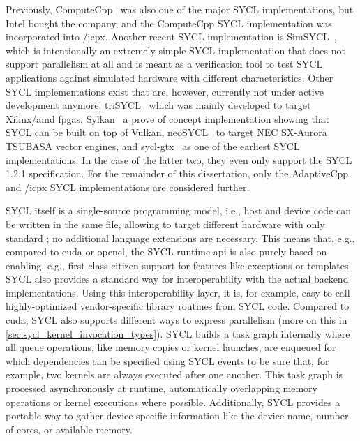 Previously, ComputeCpp~\cite{misra_development_2019} was also one of the major SYCL implementations, but Intel bought the company, and the ComputeCpp SYCL implementation was incorporated into \dpcpp/icpx. 
Another recent SYCL implementation is SimSYCL~\cite{thoman_simsycl_2024}, which is intentionally an extremely simple SYCL implementation that does not support parallelism at all and is meant as a verification tool to test SYCL applications against simulated hardware with different characteristics.  
Other SYCL implementations exist that are, however, currently not under active development anymore: triSYCL~\cite{gozillon_trisycl_2020, doumoulakis_sycl_2017} which was mainly developed to target Xilinx/\gls{amd} \glspl{fpga}, Sylkan~\cite{thoman_sylkan_2021} a prove of concept implementation showing that SYCL can be built on top of Vulkan, neoSYCL~\cite{ke_neosycl_2021} to target NEC SX-Aurora TSUBASA vector engines, and sycl-gtx~\cite{zuzek_implementation_2016} as one of the earliest SYCL implementations. 
In the case of the latter two, they even only support the SYCL 1.2.1 specification. 
For the remainder of this dissertation, only the AdaptiveCpp and \dpcpp/icpx SYCL implementations are considered further. 

SYCL itself is a single-source programming model, i.e., host and device code can be written in the same file, allowing to target different hardware with only standard \cpp; no additional language extensions are necessary. 
This means that, e.g., compared to \gls{cuda} or \gls{opencl}, the SYCL runtime \gls{api} is also purely based on \cpp enabling, e.g., first-class citizen support for \cpp features like exceptions or templates. 
SYCL also provides a standard way for interoperability with the actual backend implementations. 
Using this interoperability layer, it is, for example, easy to call highly-optimized vendor-specific library routines from SYCL code. 
Compared to \gls{cuda}, SYCL also supports different ways to express parallelism (more on this in \autoref{sec:sycl_kernel_invocation_types}). 
SYCL builds a task graph internally where all queue operations, like memory copies or kernel launches, are enqueued for which dependencies can be specified using SYCL events to be sure that, for example, two kernels are always executed after one another. 
This task graph is processed asynchronously at runtime, automatically overlapping memory operations or kernel executions where possible. 
Additionally, SYCL provides a portable way to gather device-specific information like the device name, number of cores, or available memory. 

